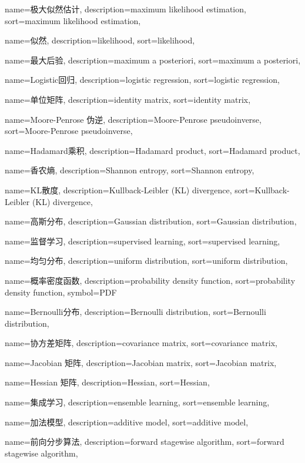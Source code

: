 
{
  name=极大似然估计,
  description={maximum likelihood estimation},
  sort={maximum likelihood estimation},
}

{
  name=似然,
  description={likelihood},
  sort={likelihood},
}

{
  name=最大后验,
  description={maximum a posteriori},
  sort={maximum a posteriori},
}

{
  name=Logistic回归,
  description={logistic regression},
  sort={logistic regression},
}

{
  name=单位矩阵,
  description={identity matrix},
  sort={identity matrix},
}

{
  name=Moore-Penrose 伪逆,
  description={Moore-Penrose pseudoinverse},
  sort={Moore-Penrose pseudoinverse},
}

{
  name=Hadamard乘积,
  description={Hadamard product},
  sort={Hadamard product},
}

{
  name=香农熵,
  description={Shannon entropy},
  sort={Shannon entropy},
}

{
  name=KL散度,
  description={Kullback-Leibler (KL) divergence},
  sort={Kullback-Leibler (KL) divergence},
}

{
  name=高斯分布,
  description={Gaussian distribution},
  sort={Gaussian distribution},
}

{
  name=监督学习,
  description={supervised learning},
  sort={supervised learning},
}

{
  name=均匀分布,
  description={uniform distribution},
  sort={uniform distribution},
}

{
  name=概率密度函数,
  description={probability density function},
  sort={probability density function},
  symbol={PDF}
}

{
  name=Bernoulli分布,
  description={Bernoulli distribution},
  sort={Bernoulli distribution},
}

{
  name=协方差矩阵,
  description={covariance matrix},
  sort={covariance matrix},
}

{
  name=Jacobian 矩阵,
  description={Jacobian matrix},
  sort={Jacobian matrix},
}

{
  name=Hessian 矩阵,
  description={Hessian},
  sort={Hessian},
}

{
  name=集成学习,
  description={ensemble learning},
  sort={ensemble learning},
}

{
  name=加法模型,
  description={additive model},
  sort={additive model},
}

{
  name=前向分步算法,
  description={forward stagewise algorithm},
  sort={forward stagewise algorithm},
}


